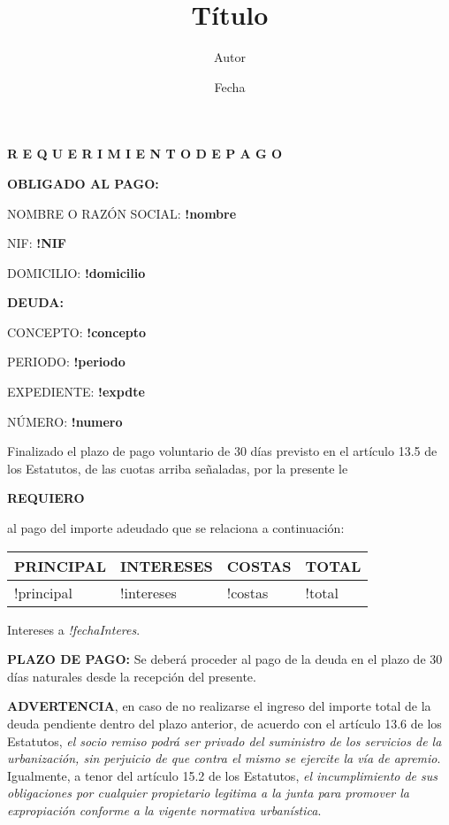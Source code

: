 \documentclass[12pt, a4paper, twoside]{article}
\title{Título}
\author{Autor}
\date{Fecha}
\begin{document}
\begin{center}
    \textbf{R E Q U E R I M I E N T O\hspace{10pt}   D E\hspace{10pt}   P A G O}
\end{center}
\begin{multicols}{2}
    \textbf{OBLIGADO AL PAGO:}

    NOMBRE O RAZÓN SOCIAL: \textbf{!nombre}

    NIF: \textbf{!NIF}

    DOMICILIO: \textbf{!domicilio}

    \columnbreak

    \textbf{DEUDA:}

    CONCEPTO: \textbf{!concepto}

    PERIODO: \textbf{!periodo}

    EXPEDIENTE: \textbf{!expdte}

    NÚMERO: \textbf{!numero}
\end{multicols}

Finalizado el plazo de pago voluntario de 30 días previsto en el artículo 13.5 de los Estatutos, de
las cuotas arriba señaladas, por la presente le
\begin{center}
    \textbf{REQUIERO}
\end{center}
al pago del importe adeudado que se relaciona a continuación:

\begin{center}
    \begin{tabularx}{\linewidth}{|Y|Y|Y|Y|}
        \hline
        \textbf{PRINCIPAL} & \textbf{INTERESES} & \textbf{COSTAS} & \textbf{TOTAL}\\
        \hline
        !principal & !intereses & !costas & !total \\
        \hline
    \end{tabularx}
\end{center}

Intereses a \emph{!fechaInteres}.

\textbf{PLAZO DE PAGO:} Se deberá proceder al pago de la deuda en el plazo de 30 días naturales
desde la recepción del presente.

\textbf{ADVERTENCIA}, en caso de no realizarse el ingreso del importe total de la deuda pendiente
dentro del plazo anterior, de acuerdo con el artículo 13.6 de los Estatutos, \emph{el socio remiso podrá ser privado del suministro de los servicios de la urbanización, sin perjuicio de que contra el
mismo se ejercite la vía de apremio}. Igualmente, a tenor del artículo 15.2 de los Estatutos, \emph{el incumplimiento de sus obligaciones por cualquier propietario legitima a la junta para promover
la expropiación conforme a la vigente normativa urbanística}.
\end{document}
